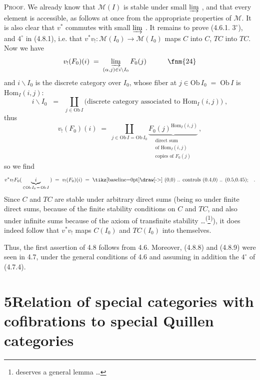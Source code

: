 \textsc{Proof}. We already know that $\mathcal{M}(I)$ is stable under small $\varinjlim$ , and that every element is accessible, as follows at once from the appropriate properties of $\mathcal{M}$. It is also clear that $v^{*}$ commutes with small $\varinjlim$ . It remains to prove (4.6.1. $3^{\circ}$), and $4^{\circ}$ in (4.8.1), i.e.  that $v^{*}v_{!} : \mathcal{M}(I_0) \longrightarrow \mathcal{M}(I_0)$ maps $C$ into $C$, $TC$ into $TC$. Now we have
\[
v_{!}(F_0)(i) \;=\; \varinjlim_{(\alpha,j)\in i\backslash I_0} F_0(j) \qquad\quad \text{\fnm{24}}
\]
and $i\backslash I_0$ is the discrete category over $I_0$, whose fiber at $j \in \mathrm{Ob}\, I_0 \;=\; \mathrm{Ob}\, I$ is $\mathrm{Hom}_I(i,j)$:
\[
i\backslash I_0 \;\;=\;\; \coprod_{j\in \mathrm{Ob}\, I} \text{(discrete category associated to $\mathrm{Hom}_I(i,j)$)} \; ,
\]
thus
\[
v_{!}(F_0)(i) \;=\; \coprod_{j\in \mathrm{Ob}\, I = \mathrm{Ob}\, I_0} \underbrace{F_0(j)^{\mathrm{Hom}_I(i,j)}}_{\substack{\text{direct sum}\\ \text{of } \mathrm{Hom}_I(i,j)\\ \text{copies of } F_0(j)}} \, ,
\]
so we find
\[
v^{*}v_{!}F_0( \, \underbrace{\; i \;}_{\in \mathrm{Ob}\, I_0 \,=\, \mathrm{Ob}\, I} \, ) \;=\; v_{!}(F_0)(i) \;=\; \text{\tikz[baseline=0pt]\draw[->] (0,0) .. controls (0.4,0) .. (0.5,0.45);} \quad .
\]
Since $C$ and $TC$ are stable under arbitrary direct sums (being so under finite direct sums, because of the finite stability conditions on $C$ and $TC$, and also under infinite sums because of the axiom of transfinite stability \dots\textsuperscript{(}\footnote[25]{deserves a general lemma \dots}\textsuperscript{)}), it does indeed follow that $v^{*}v_{!}$ maps $C(I_0)$ and $TC(I_0)$ into themselves. %

Thus, the first assertion of 4.8 follows from 4.6. Moreover, (4.8.8) and (4.8.9) were seen in 4.7, under the general conditions of 4.6 and assuming in addition the $4^{\circ}$ of (4.7.4).


\section*{5\quad Relation of special categories with cofibrations to special Quillen categories}

